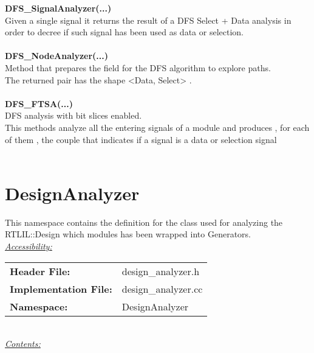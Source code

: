 \documentclass{article}
\newcommand{\sectionbreak}{\clearpage}
\begin{document}
\textbf{DFS\_SignalAnalyzer(...)}\\
Given a single signal it returns the result of a DFS Select + Data analysis in order to decree if such signal has been used as data or selection.\\\\

\textbf{DFS\_NodeAnalyzer(...)}\\
Method that prepares the field for the DFS algorithm to explore paths.\\
The returned pair has the shape <Data, Select> .\\\\

\textbf{DFS\_FTSA(...)}\\
DFS analysis with bit slices enabled.\\
This methods analyze all the entering signals of a module and produces , for each of them , the couple that indicates if a signal is a data or selection signal\\\\

\sectionbreak{\clearpage}


\section{DesignAnalyzer}

This namespace contains the definition for the class used for analyzing the RTLIL::Design which modules has been wrapped into Generators.\\

\underline{\textit{\underline{Accessibility: }}}\\

\begin{tabular}{ll}
	\textbf{Header File:} & design\_analyzer.h\\
	\textbf{Implementation File:} & design\_analyzer.cc\\
	\textbf{Namespace: } & DesignAnalyzer\\
\end{tabular}\\

\underline{\textit{\underline{Contents: }}}\\
\end{document}
